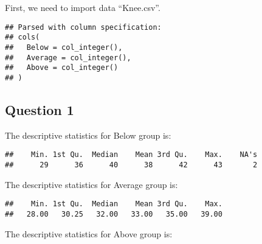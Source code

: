 \documentclass[]{article}
\newenvironment{Shaded}{\begin{snugshade}}{\end{snugshade}}
\newcommand{\KeywordTok}[1]{\textcolor[rgb]{0.13,0.29,0.53}{\textbf{#1}}}
\newcommand{\DataTypeTok}[1]{\textcolor[rgb]{0.13,0.29,0.53}{#1}}
\newcommand{\StringTok}[1]{\textcolor[rgb]{0.31,0.60,0.02}{#1}}
\newcommand{\OperatorTok}[1]{\textcolor[rgb]{0.81,0.36,0.00}{\textbf{#1}}}
\newcommand{\NormalTok}[1]{#1}
\begin{document}
First, we need to import data ``Knee.csv''.

\begin{Shaded}
\end{Shaded}

\begin{verbatim}
## Parsed with column specification:
## cols(
##   Below = col_integer(),
##   Average = col_integer(),
##   Above = col_integer()
## )
\end{verbatim}

\subsection{Question 1}\label{question-1-2}

The descriptive statistics for Below group is:

\begin{Shaded}
\end{Shaded}

\begin{verbatim}
##    Min. 1st Qu.  Median    Mean 3rd Qu.    Max.    NA's 
##      29      36      40      38      42      43       2
\end{verbatim}

The descriptive statistics for Average group is:

\begin{Shaded}
\end{Shaded}

\begin{verbatim}
##    Min. 1st Qu.  Median    Mean 3rd Qu.    Max. 
##   28.00   30.25   32.00   33.00   35.00   39.00
\end{verbatim}

The descriptive statistics for Above group is:
\end{document}
